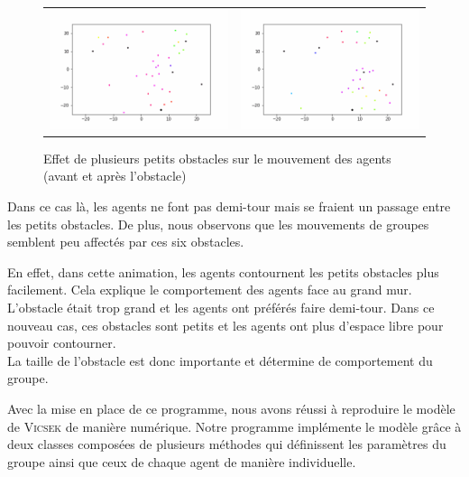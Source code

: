 \documentclass[french, a4paper, 12pt, openany]{report}
\begin{document}
		\begin{figure}[!h]
		\centering
		\begin{tabular}{cc}
			\includegraphics[width=8cm]{images/image_20.png} & \includegraphics[width=8cm]{images/image_21.png} \\
		\end{tabular}
		\caption{Effet de plusieurs petits obstacles sur le mouvement des agents (avant et après l'obstacle)}
		\label{obstacles2}
	\end{figure}
	
	Dans ce cas là, les agents ne font pas demi-tour mais se fraient un passage entre les petits obstacles. De plus, nous observons que les mouvements de groupes semblent peu affectés par ces six obstacles.
	
	 En effet, dans cette animation, les agents contournent les petits obstacles plus facilement. Cela explique le comportement des agents face au grand mur. L'obstacle était trop grand et les agents ont préférés faire demi-tour. Dans ce nouveau cas, ces obstacles sont petits et les agents ont plus d'espace libre pour pouvoir contourner. \\
	 
	 La taille de l'obstacle est donc importante et détermine de comportement du groupe.  
	


   Avec la mise en place de ce programme, nous avons réussi à reproduire le modèle de \textsc{Vicsek} de manière numérique. Notre programme implémente le modèle grâce à deux classes composées de plusieurs méthodes qui définissent les paramètres du groupe ainsi que ceux de chaque agent de manière individuelle.\\
   
\end{document}
